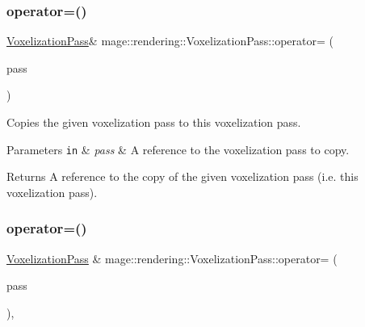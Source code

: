 \subsubsection{\texorpdfstring{operator=()}{operator=()}\hspace{0.1cm}{\footnotesize\ttfamily [1/2]}}
{\footnotesize\ttfamily \hyperlink{classmage_1_1rendering_1_1_voxelization_pass}{Voxelization\+Pass}\& mage\+::rendering\+::\+Voxelization\+Pass\+::operator= (\begin{DoxyParamCaption}\item[{const \hyperlink{classmage_1_1rendering_1_1_voxelization_pass}{Voxelization\+Pass} \&}]{pass }\end{DoxyParamCaption})\hspace{0.3cm}{\ttfamily [delete]}}

Copies the given voxelization pass to this voxelization pass.


\begin{DoxyParams}[1]{Parameters}
\mbox{\tt in}  & {\em pass} & A reference to the voxelization pass to copy. \\
\hline
\end{DoxyParams}
\begin{DoxyReturn}{Returns}
A reference to the copy of the given voxelization pass (i.\+e. this voxelization pass). 
\end{DoxyReturn}
\hypertarget{classmage_1_1rendering_1_1_voxelization_pass_ac7beb95fbf6fd85355703854ac282e91}{}\label{classmage_1_1rendering_1_1_voxelization_pass_ac7beb95fbf6fd85355703854ac282e91} 
\subsubsection{\texorpdfstring{operator=()}{operator=()}\hspace{0.1cm}{\footnotesize\ttfamily [2/2]}}
{\footnotesize\ttfamily \hyperlink{classmage_1_1rendering_1_1_voxelization_pass}{Voxelization\+Pass} \& mage\+::rendering\+::\+Voxelization\+Pass\+::operator= (\begin{DoxyParamCaption}\item[{\hyperlink{classmage_1_1rendering_1_1_voxelization_pass}{Voxelization\+Pass} \&\&}]{pass }\end{DoxyParamCaption})\hspace{0.3cm}{\ttfamily [default]}, {\ttfamily [noexcept]}}


